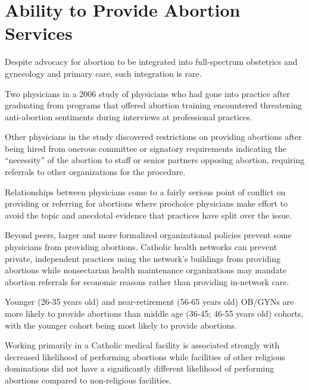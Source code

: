 \documentclass[letterpaper, 12pt]{article}
\begin{document}
\section*{Ability to Provide Abortion Services}

Despite advocacy for abortion to be integrated into full-spectrum obstetrics and gynecology and primary care, such integration is rare. \autocite[pg 146]{freedman_obstacles_2010}

Two physicians in a 2006 study of physicians who had gone into practice after graduating from programs that offered abortion training encountered threatening anti-abortion sentiments during interviews at professional practices. \autocite[pg 148]{freedman_obstacles_2010}

Other physicians in the study discovered restrictions on providing abortions after being hired from onerous committee or signatory requirements indicating the ``necessity'' of the abortion to staff or senior partners opposing abortion, requiring referrals to other organizations for the procedure. \autocite[pg 148]{freedman_obstacles_2010}

Relationships between physicians come to a fairly serious point of conflict on providing or referring for abortions where prochoice physicians make effort to avoid the topic and anecdotal evidence that practices have split over the issue. \autocite[pg 149]{freedman_obstacles_2010}

Beyond peers, larger and more formalized organizational policies prevent some physicians from providing abortions. Catholic health networks can prevent private, independent practices using the network's buildings from providing abortions while nonsectarian health maintenance organizations may mandate abortion referrals for economic reasons rather than providing in-network care. \autocite[pg 149]{freedman_obstacles_2010}

Younger (26-35 years old) and near-retirement (56-65 years old) OB/GYNs are more likely to provide abortions than middle age (36-45; 46-55 years old) cohorts, with the younger cohort being most likely to provide abortions. \autocite[pg. 611]{stulberg_abortion_2011}

Working primarily in a Catholic medical facility is associated strongly with decreased likelihood of performing abortions while facilities of other religious dominations did not have a significantly different likelihood of performing abortions compared to non-religious facilities. \autocite[pg. 612]{stulberg_abortion_2011}
\end{document}
